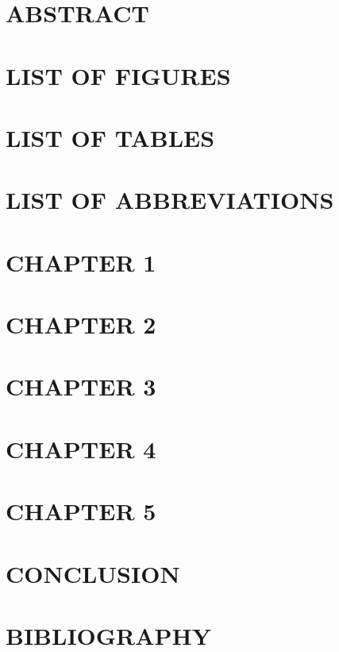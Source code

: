 \documentclass[12pt,a4paper]{report}
\begin{document}
\newpage
\section{ABSTRACT}


\newpage
\section{LIST OF FIGURES}

\newpage
\section{LIST OF TABLES}

\newpage
\section{LIST OF ABBREVIATIONS}

\newpage
\section{CHAPTER 1}

\newpage
\section{CHAPTER 2}

\newpage
\section{CHAPTER 3}

\newpage
\section{CHAPTER 4}

\newpage
\section{CHAPTER 5}

\newpage
\section{CONCLUSION}

\newpage
\section{BIBLIOGRAPHY}
\end{document}
